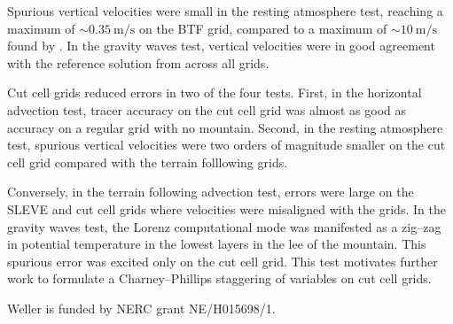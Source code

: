 \documentclass[twocol]{ametsoc}
\begin{document}
Spurious vertical velocities were small in the resting atmosphere test, reaching a maximum of $\sim \SI{0.35}{\meter\per\second}$ on the BTF grid, compared to a maximum of $\sim \SI{10}{\meter\per\second}$ found by \citet{klemp2011}.  In the gravity waves test, vertical velocities were in good agreement with the reference solution from \citet{melvin2010} across all grids.

Cut cell grids reduced errors in two of the four tests.  First, in the horizontal advection test, tracer accuracy on the cut cell grid was almost as good as accuracy on a regular grid with no mountain.  Second, in the resting atmosphere test, spurious vertical velocities were two orders of magnitude smaller on the cut cell grid compared with the terrain folllowing grids.

Conversely, in the terrain following advection test, errors were large on the SLEVE and cut cell grids where velocities were misaligned with the grids.  In the gravity waves test, the Lorenz computational mode was manifested as a zig--zag in potential temperature in the lowest layers in the lee of the mountain.  This spurious error was excited only on the cut cell grid.  This test motivates further work to formulate a Charney--Phillips staggering of variables on cut cell grids.

\acknowledgments
{} Weller is funded by NERC grant NE/H015698/1.







\end{document}
